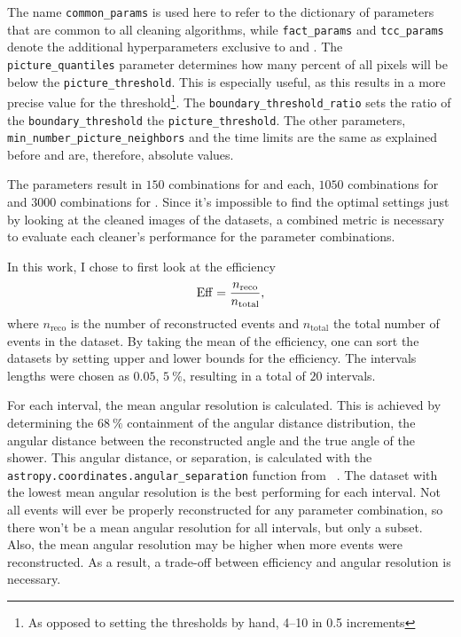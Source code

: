 The name \texttt{common\_params} is used here to refer to the dictionary of parameters that are common
to all cleaning algorithms, while \texttt{fact\_params} and \texttt{tcc\_params} denote the additional
hyperparameters exclusive to \fact{} and \tcc{}. The \texttt{picture\_quantiles} parameter determines
how many percent of all pixels will be below the \texttt{picture\_threshold}. This is especially useful,
as this results in a more precise value for the threshold\footnote{As opposed to setting the thresholds by hand, \eg{} \numrange{4}{10} in \num{0.5} increments}.
The \texttt{boundary\_threshold\_ratio} sets
the ratio of the \texttt{boundary\_threshold} \wrt the \texttt{picture\_threshold}. The other parameters,
\texttt{min\_number\_picture\_neighbors} and the time limits are the same as explained before and are,
therefore, absolute values.

The parameters result in \(\num{150}\) combinations for \tailcuts{} and \mars{} each, \(\num{1050}\) combinations for
\fact{} and \(\num{3000}\) combinations for \tcc{}.
Since it's impossible to find the optimal settings just by looking at the
cleaned images of the datasets, a combined metric is necessary to evaluate each cleaner's performance
for the parameter combinations.

In this work, I chose to first look at the efficiency
\begin{equation}\label{eq:efficiency}
    \operatorname{Eff} =  \frac{n_{\mathrm{reco}}}{n_{\mathrm{total}}},
\end{equation}
where \(n_{\mathrm{reco}}\) is the number of reconstructed events and \(n_{\mathrm{total}}\)
the total number of events in the dataset. By taking the mean of the efficiency, one can sort the
datasets by setting upper and lower bounds for the efficiency. The intervals lengths were chosen as
\(\num{0.05}\), \ie \(\SI{5}{\percent}\), resulting in a total of \(\num{20}\) intervals.

For each interval, the mean angular resolution is calculated. This is achieved by determining the
\(\SI{68}{\percent}\) containment of the angular distance distribution, \ie the angular distance
between the reconstructed angle and the true angle of the shower. This angular distance, or separation, is calculated
with the \texttt{astropy.coordinates.angular\_separation} function from \astropy{}~\cite{astropy1, astropy2}. The dataset with the lowest
mean angular resolution is the best performing for each interval. Not all events will ever be properly reconstructed
for any parameter combination, so there won't be a mean angular resolution for all intervals, but only
a subset. Also, the mean angular resolution may be higher when more events were reconstructed.
As a result, a trade-off between efficiency and angular resolution is necessary.

